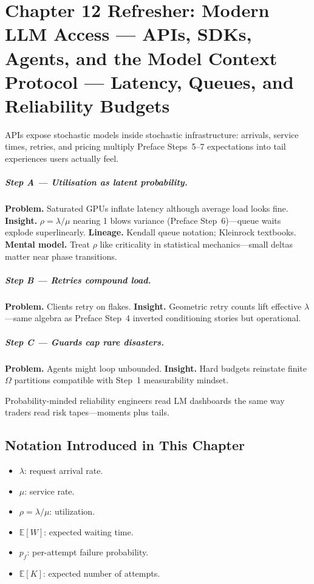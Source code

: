 \chapter{Chapter 12 Refresher: Modern LLM Access --- APIs, SDKs, Agents, and the Model Context Protocol --- Latency, Queues, and Reliability Budgets}
\label{chap:agents}

\scenelabel
APIs expose stochastic models inside stochastic infrastructure: arrivals, service times, retries, and pricing multiply Preface Steps~5--7 expectations into tail experiences users actually feel.

\paragraph{Step A --- Utilisation as latent probability.}
\textbf{Problem.} Saturated GPUs inflate latency although average load looks fine.
\textbf{Insight.} \(\rho=\lambda/\mu\) nearing 1 blows variance (Preface Step~6)---queue waits explode superlinearly.
\textbf{Lineage.} Kendall queue notation; Kleinrock textbooks.
\textbf{Mental model.} Treat \(\rho\) like criticality in statistical mechanics---small deltas matter near phase transitions.

\paragraph{Step B --- Retries compound load.}
\textbf{Problem.} Clients retry on flakes.
\textbf{Insight.} Geometric retry counts lift effective \(\lambda\)---same algebra as Preface Step~4 inverted conditioning stories but operational.

\paragraph{Step C --- Guards cap rare disasters.}
\textbf{Problem.} Agents might loop unbounded.
\textbf{Insight.} Hard budgets reinstate finite \(\Omega\) partitions compatible with Step~1 measurability mindset.

Probability-minded reliability engineers read LM dashboards the same way traders read risk tapes---moments plus tails.

\section*{Notation Introduced in This Chapter}
\begin{itemize}[leftmargin=1.5em]
  \item $\lambda$: request arrival rate.
  \item $\mu$: service rate.
  \item $\rho=\lambda/\mu$: utilization.
  \item $\mathbb{E}[W]$: expected waiting time.
  \item $p_f$: per-attempt failure probability.
  \item $\mathbb{E}[K]$: expected number of attempts.
\end{itemize}

